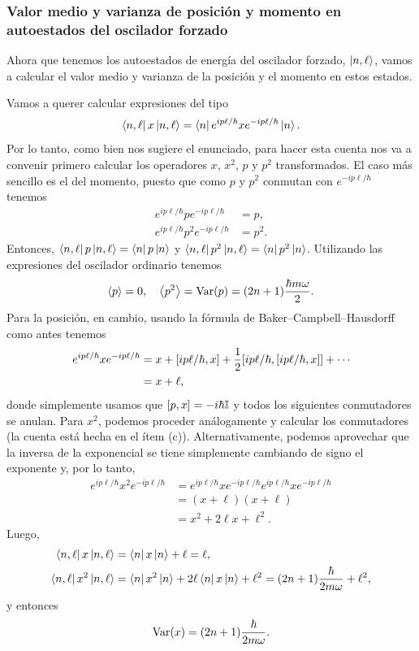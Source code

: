 \documentclass[10pt, a4paper]{article}
\numberwithin{equation}{subsection}
\begin{document}
\subsubsection{Valor medio y varianza de posición y momento en autoestados del
  oscilador forzado}
Ahora que tenemos los autoestados de energía del oscilador forzado,
$\ket{n,\ell}$, vamos a calcular el valor medio y varianza de la posición y el
momento en estos estados.

Vamos a querer calcular expresiones del tipo
\begin{equation}
  \bra{n,\ell}x\ket{n,\ell} = \bra{n}e^{ip\ell/\hbar} x
    e^{-ip\ell/\hbar}\ket{n}.
\end{equation}
Por lo tanto, como bien nos sugiere el enunciado, para hacer esta cuenta
nos va a convenir primero calcular los operadores $x$, $x^2$, $p$ y $p^2$
transformados. El caso más sencillo es el del momento, puesto que como $p$ y
$p^2$ conmutan con $e^{-ip\ell/\hbar}$ tenemos
\begin{align}
  e^{ip\ell/\hbar}pe^{-ip\ell/\hbar} &= p, \\
  e^{ip\ell/\hbar}p^2e^{-ip\ell/\hbar} &= p^2.
\end{align}
Entonces, $\bra{n, \ell}p\ket{n, \ell} = \bra{n}p\ket{n}$ y $\bra{n,
\ell}p^2\ket{n,\ell} = \bra{n}p^2\ket{n}$. Utilizando las expresiones del
oscilador ordinario tenemos
\begin{equation}
  \expval{p} = 0, \quad \expval{p^2} = \Var(p) =
    (2n + 1)\frac{\hbar m \omega}{2}.
\end{equation}
Para la posición, en cambio, usando la fórmula de Baker--Campbell--Hausdorff
como antes tenemos
\begin{align}
  e^{ip\ell/\hbar}xe^{-ip\ell/\hbar} &= x + \comm{ip\ell/\hbar}{x} +
    \frac{1}{2}\comm{ip\ell/\hbar}{\comm{ip\ell/\hbar}{x}} + \cdots \\
  &= x + \ell,
\end{align}
donde simplemente usamos que $\comm{p}{x} = -i\hbar\Id$ y todos los siguientes
conmutadores se anulan. Para $x^2$, podemos proceder análogamente y calcular
los conmutadores (la cuenta está hecha en el ítem (c)). Alternativamente,
podemos aprovechar que la inversa de la exponencial se tiene simplemente
cambiando de signo el exponente y, por lo tanto,
\begin{align}
  e^{ip\ell/\hbar}x^2e^{-ip\ell/\hbar} &= e^{ip\ell/\hbar} x e^{-ip\ell/\hbar}
    e^{ip\ell/\hbar}xe^{-ip\ell/\hbar} \\
  &= (x + \ell)(x + \ell) \\
  &= x^2 + 2\ell x + \ell^2.
\end{align}
Luego,
\begin{align}
  \bra{n, \ell}x\ket{n, \ell} &= \bra{n}x\ket{n} + \ell = \ell, \\
    \bra{n, \ell}x^2\ket{n, \ell} &= \bra{n}x^2\ket{n} + 2\ell\bra{n}x\ket{n} +
    \ell^2 = (2n + 1)\frac{\hbar}{2m\omega} + \ell^2,
\end{align}
y entonces
\begin{equation}
  \Var(x) = (2n + 1)\frac{\hbar}{2m\omega}.
\end{equation}
\end{document}
